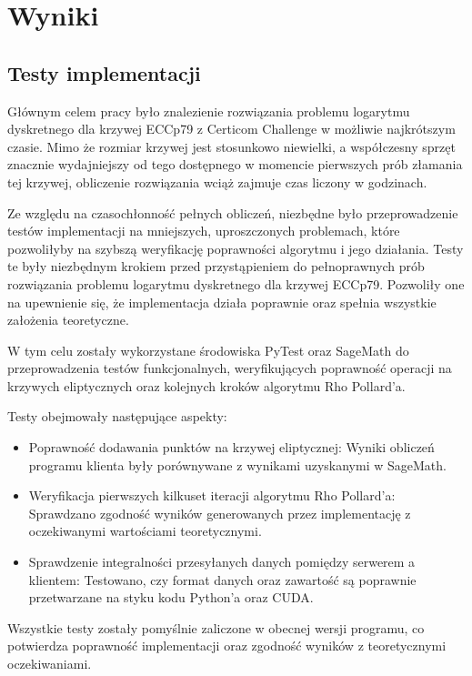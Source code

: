 \newpage
\section{Wyniki}
\subsection{Testy implementacji}

Głównym celem pracy było znalezienie rozwiązania problemu logarytmu dyskretnego
dla krzywej ECCp79 z Certicom Challenge w możliwie najkrótszym czasie. Mimo że
rozmiar krzywej jest stosunkowo niewielki, a współczesny sprzęt znacznie
wydajniejszy od tego dostępnego w momencie pierwszych prób złamania tej krzywej,
obliczenie rozwiązania wciąż zajmuje czas liczony w godzinach.

Ze względu na czasochłonność pełnych obliczeń, niezbędne było przeprowadzenie
testów implementacji na mniejszych, uproszczonych problemach, które pozwoliłyby
na szybszą weryfikację poprawności algorytmu i jego działania. Testy te były
niezbędnym krokiem przed przystąpieniem do pełnoprawnych prób rozwiązania
problemu logarytmu dyskretnego dla krzywej ECCp79. Pozwoliły one na upewnienie się,
że implementacja działa poprawnie oraz spełnia wszystkie założenia teoretyczne.

W tym celu zostały wykorzystane środowiska PyTest oraz SageMath do przeprowadzenia testów
funkcjonalnych, weryfikujących poprawność operacji na krzywych eliptycznych
oraz kolejnych kroków algorytmu Rho Pollard'a.

Testy obejmowały następujące aspekty:
\begin{itemize}
    \item Poprawność dodawania punktów na krzywej eliptycznej:
          Wyniki obliczeń programu klienta były porównywane z wynikami uzyskanymi
          w SageMath.
    \item Weryfikacja pierwszych kilkuset iteracji algorytmu Rho Pollard'a:
          Sprawdzano zgodność wyników generowanych przez implementację z oczekiwanymi
          wartościami teoretycznymi.
    \item Sprawdzenie integralności przesyłanych danych pomiędzy serwerem a
          klientem: Testowano, czy format danych oraz zawartość są poprawnie przetwarzane
          na styku kodu Python'a oraz CUDA.
\end{itemize}

Wszystkie testy zostały pomyślnie zaliczone w obecnej wersji programu, co
potwierdza poprawność implementacji oraz zgodność wyników z teoretycznymi
oczekiwaniami.

